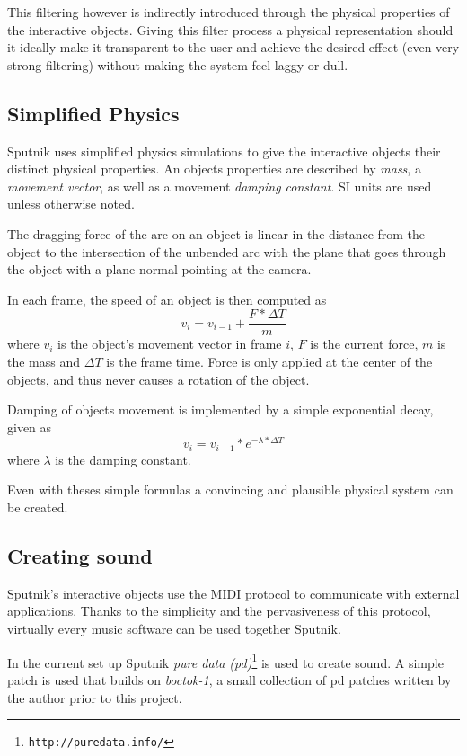 \documentclass[10pt,a4paper]{scrartcl}
\begin{document}
This filtering however is indirectly introduced through the physical properties of the interactive objects. Giving this filter process a physical representation should it ideally make it transparent to the user and achieve the desired effect (even very strong filtering) without making the system feel laggy or dull.


\subsection{Simplified Physics}
Sputnik uses simplified physics simulations to give the interactive objects their distinct physical properties. An objects properties are described by \emph{mass}, a \emph{movement vector}, as well as a movement \emph{damping constant}. SI units are used unless otherwise noted.

The dragging force of the arc on an object is linear in the distance from the object to the intersection of the unbended arc with the plane that goes through the object with a plane normal pointing at the camera.

In each frame, the speed of an object is then computed as 
\begin{equation}
v_i = v_{i-1} + \frac{F * \Delta T}{m} 
\end{equation}
where $v_i$ is the object's movement vector in frame $i$, $F$ is the current force, $m$ is the mass and $\Delta T$ is the frame time. Force is only applied at the center of the objects, and thus never causes a rotation of the object.

Damping of objects movement is implemented by a simple exponential decay, given as
\begin{equation}
v_i = v_{i-1} * e^{-\lambda * \Delta T}
\end{equation}
where $\lambda$ is the damping constant.

Even with theses simple formulas a convincing and plausible physical system can be created. 


\subsection{Creating sound}
Sputnik's interactive objects use the MIDI  protocol to communicate with external applications. Thanks to the simplicity and the pervasiveness of this protocol, virtually every music software can be used together Sputnik. 

In the current set up Sputnik \emph{pure data (pd)}\footnote{\texttt{http://puredata.info/}} is used to create sound. A simple patch is used that builds on \emph{boctok-1}, a small collection of pd patches written by the author prior to this project. 
\end{document}

